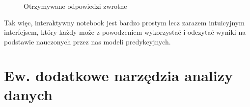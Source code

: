 \begin{figure}%
    \centering
    \qquad
    \caption{Otrzymywane odpowiedzi zwrotne}%
    \label{fig:Results}%
\end{figure}
Tak więc, interaktywny notebook jest bardzo prostym lecz zarazem intuicyjnym interfejsem, który każdy może z powodzeniem wykorzystać i odczytać wyniki na podstawie nauczonych przez nas modeli predykcyjnych.
\section{Ew. dodatkowe narzędzia analizy danych}